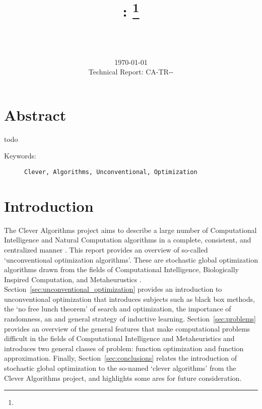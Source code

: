 \documentclass[a4paper, 11pt]{article}
\title{{\myreporttitle}: {\myreportsubtitle}\footnote{\myreportlicense}}
\author{\myreportauthor\\{\myreportemail}\\\small\myreportproject}
\date{\today\\{\small{Technical Report: CA-TR-{\myreportdate}-\myreportversion}}}
\begin{document}
\maketitle

\section*{Abstract} 
todo

\begin{description}
	\item[Keywords:] {\small\texttt{Clever, Algorithms, Unconventional, Optimization}}
\end{description} 

\section{Introduction}
\label{sec:introduction}
The Clever Algorithms project aims to describe a large number of Computational Intelligence and Natural Computation algorithms in a complete, consistent, and centralized manner \cite{Brownlee2010}.
This report provides an overview of so-called `unconventional optimization algorithms'. These are stochastic global optimization algorithms drawn from the fields of Computational Intelligence, Biologically Inspired Computation, and Metaheurustics \cite{Brownlee2010c}.
Section~\ref{sec:unconventional_optimization} provides an introduction to unconventional optimization that introduces subjects such as black box methods, the `no free lunch theorem' of search and optimization, the importance of randomness, an and general strategy of inductive learning. 
Section~\ref{sec:problems} provides an overview of the general features that make computational problems difficult in the fields of Computational Intelligence and Metaheuristics and introduces two general classes of problem: function optimization and function approximation.
Finally, Section~\ref{sec:conclusions} relates the introduction of stochastic global optimization to the so-named `clever algorithms' from the Clever Algorithms project, and highlights some ares for future consideration.



% 
% 
\end{document}
